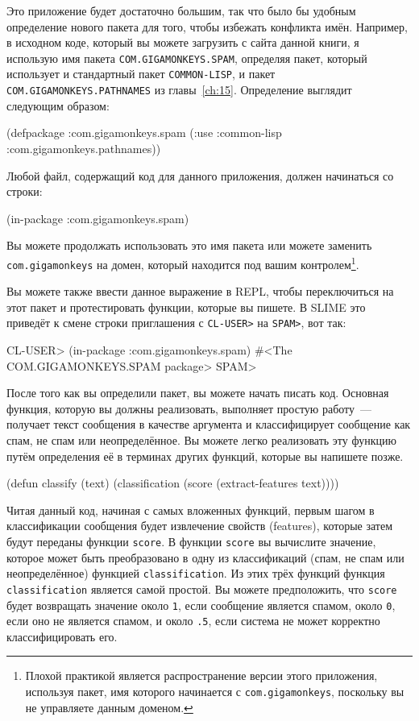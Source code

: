 Это приложение будет достаточно большим, так что было бы удобным определение нового пакета
для того, чтобы избежать конфликта имён.  Например, в исходном коде, который вы можете
загрузить с сайта данной книги, я использую имя пакета \lstinline{COM.GIGAMONKEYS.SPAM},
определяя пакет, который использует и стандартный пакет \lstinline{COMMON-LISP}, и пакет
\lstinline{COM.GIGAMONKEYS.PATHNAMES} из главы~\ref{ch:15}.  Определение выглядит сле\-дую\-щим
образом:

\begin{myverb}
(defpackage :com.gigamonkeys.spam
  (:use :common-lisp :com.gigamonkeys.pathnames))
\end{myverb}

Любой файл, содержащий код для данного приложения, должен начинаться со строки:

\begin{myverb}
(in-package :com.gigamonkeys.spam)
\end{myverb}

Вы можете продолжать использовать это имя пакета или можете заменить
\lstinline{com.gigamonkeys} на домен, который находится под вашим контролем\footnote{Плохой
  практикой является распространение версии этого приложения, используя пакет, имя
  которого начинается с \lstinline{com.gigamonkeys}, поскольку вы не управляете данным
  доменом.}.

Вы можете также ввести данное выражение в REPL, чтобы переключиться на этот пакет и
протестировать функции, которые вы пишете.  В SLIME это приведёт к смене строки
приглашения с \lstinline{CL-USER>} на \lstinline{SPAM>}, вот так:

\begin{myverb}
CL-USER> (in-package :com.gigamonkeys.spam)
#<The COM.GIGAMONKEYS.SPAM package>
SPAM> 
\end{myverb}

После того как вы определили пакет, вы можете начать писать код.  Основная функция,
которую вы должны реализовать, выполняет простую работу~--- получает текст сообщения в
качестве аргумента и классифицирует сообщение как спам, не спам или неопределённое.  Вы
можете легко реализовать эту функцию путём определения её в терминах других функций,
которые вы напишете позже.

\begin{myverb}
(defun classify (text)
  (classification (score (extract-features text))))
\end{myverb}

Читая данный код, начиная с самых вложенных функций, первым шагом в классификации сообщения
будет извлечение свойств (features), которые затем будут переданы функции \lstinline{score}.  В
функции \lstinline{score} вы вычислите значение, которое может быть преобразовано в одну из
классификаций (спам, не спам или неопределённое) функцией \lstinline{classification}.  Из этих
трёх функций функция \lstinline{classification} является самой простой. Вы можете
предположить, что \lstinline{score} будет возвращать значение около \lstinline{1}, если сообщение
является спамом, около \lstinline{0}, если оно не является спамом, и около \lstinline{.5}, если
система не может корректно классифицировать его.


